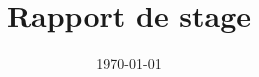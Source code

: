 \title{\vspace{1.5cm}Rapport de stage \\ \vspace{0.25cm} \LARGE{\textbf{\projecttitle}}}
\author{}
\date{\today}